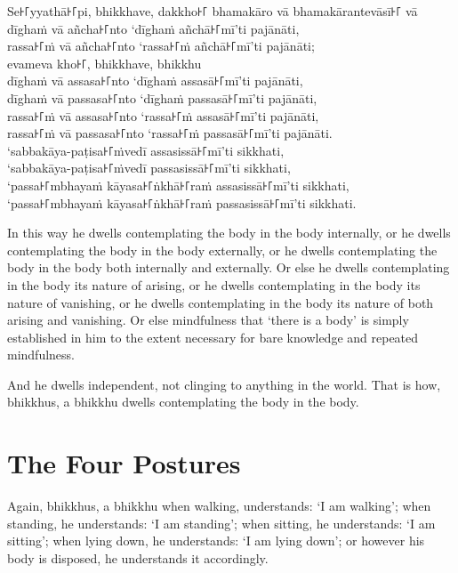 Se꜔꜒yyathā꜔꜒pi, bhikkhave, dakkho꜔꜒ bhamakāro vā bhamakārantevāsī꜔꜒ vā\\
dīghaṁ vā añcha꜔꜒nto ‘dīghaṁ añchā꜔꜒mī’ti pajānāti,\\
rassa꜔꜒ṁ vā añcha꜔꜒nto ‘rassa꜔꜒ṁ añchā꜔꜒mī’ti pajānāti;\\
evameva kho꜔꜒, bhikkhave, bhikkhu\\
dīghaṁ vā assasa꜔꜒nto ‘dīghaṁ assasā꜔꜒mī’ti pajānāti,\\
dīghaṁ vā passasa꜔꜒nto ‘dīghaṁ passasā꜔꜒mī’ti pajānāti,\\
rassa꜔꜒ṁ vā assasa꜔꜒nto ‘rassa꜔꜒ṁ assasā꜔꜒mī’ti pajānāti,\\
rassa꜔꜒ṁ vā passasa꜔꜒nto ‘rassa꜔꜒ṁ passasā꜔꜒mī’ti pajānāti.\\
‘sabbakāya-paṭisa꜔꜒ṁvedī assasissā꜔꜒mī’ti sikkhati,\\
‘sabbakāya-paṭisa꜔꜒ṁvedī passasissā꜔꜒mī’ti sikkhati,\\
‘passa꜔꜒mbhayaṁ kāyasa꜔꜒ṅkhā꜔꜒raṁ assasissā꜔꜒mī’ti sikkhati,\\
‘passa꜔꜒mbhayaṁ kāyasa꜔꜒ṅkhā꜔꜒raṁ passasissā꜔꜒mī’ti sikkhati.

\englishPage

In this way he dwells contemplating the body in the body internally, or he
dwells contemplating the body in the body externally, or he dwells contemplating
the body in the body both internally and externally. Or else he dwells
contemplating in the body its nature of arising, or he dwells contemplating in
the body its nature of vanishing, or he dwells contemplating in the body its
nature of both arising and vanishing. Or else mindfulness that ‘there is a body’
is simply established in him to the extent necessary for bare knowledge and
repeated mindfulness.

And he dwells independent, not clinging to anything in the world. That is how,
bhikkhus, a bhikkhu dwells contemplating the body in the body.


\section{The Four Postures}

Again, bhikkhus, a bhikkhu when walking, understands: ‘I am walking’; when
standing, he understands: ‘I am standing’; when sitting, he understands: ‘I am
sitting’; when lying down, he understands: ‘I am lying down’; or however his
body is disposed, he understands it accordingly.

